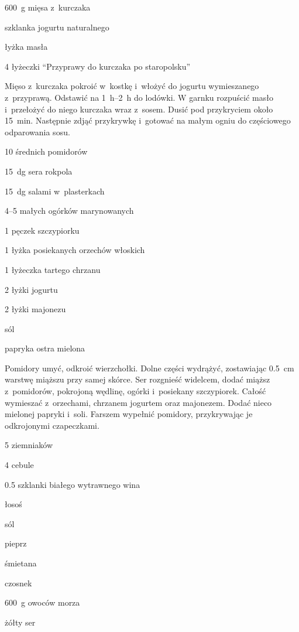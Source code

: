 \documentclass[../kucharek.tex]{subfiles}
\begin{document}

\begin{Ingred}
    \item \qty{600}{\gram} mięsa z~kurczaka
    \item szklanka jogurtu naturalnego
    \item łyżka masła
    \item \num{4} łyżeczki \enquote{Przyprawy do kurczaka po staropolsku}
\end{Ingred}

Mięso z~kurczaka pokroić w~kostkę i~włożyć do jogurtu wymieszanego z~przyprawą.
Odstawić na \qtyrange{1}{2}{\hour} do lodówki. W garnku rozpuścić masło
i~przełożyć do niego kurczaka wraz z~sosem. Dusić pod przykryciem około
\qty{15}{\minute}. Następnie zdjąć przykrywkę i~gotować na małym ogniu do
częściowego odparowania sosu.


\begin{Ingred}
    \item \num{10} średnich pomidorów
    \item \qty{15}{\deca\gram} sera rokpola
    \item \qty{15}{\deca\gram} salami w~plasterkach
    \item \numrange{4}{5} małych ogórków marynowanych
    \item \num{1} pęczek szczypiorku
    \item \num{1} łyżka posiekanych orzechów włoskich
    \item \num{1} łyżeczka tartego chrzanu
    \item \num{2} łyżki jogurtu
    \item \num{2} łyżki majonezu
    \item sól
    \item papryka ostra mielona
\end{Ingred}

Pomidory umyć, odkroić wierzchołki. Dolne części wydrążyć, zostawiając
\qty{.5}{\centi\metre} warstwę miąższu przy samej skórce. Ser rozgnieść
widelcem, dodać miąższ z~pomidorów, pokrojoną wędlinę, ogórki i~posiekany
szczypiorek. Całość wymieszać z~orzechami, chrzanem jogurtem oraz majonezem.
Dodać nieco mielonej papryki i~soli. Farszem wypełnić pomidory, przykrywając je
odkrojonymi czapeczkami.


\begin{Ingred}
    \item \num{5} ziemniaków
    \item \num{4} cebule
    \item \num{.5} szklanki białego wytrawnego wina
    \item łosoś
    \item sól
    \item pieprz
    \item śmietana
    \item czosnek
    \item \qty{600}{\gram} owoców morza
    \item żółty ser
\end{Ingred}
\end{document}

